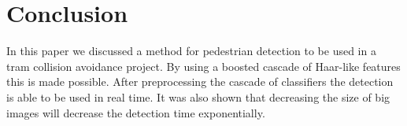 \documentclass{article}
\begin{document}
\section{Conclusion}
In this paper we discussed a method for pedestrian detection to be used in a tram collision avoidance project. By using a boosted cascade of Haar-like features this is made possible. After preprocessing the cascade of classifiers the detection is able to be used in real time. It was also shown that decreasing the size of big images will decrease the detection time exponentially.


\end{document}
